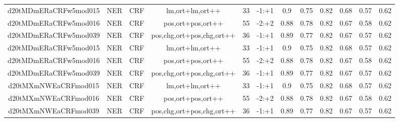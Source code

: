 \documentclass[a4paper]{article}
\begin{document}
\begin{landscape}
\begin{center}
\begin{tabular}{ |c|c|c|c|c|c|c|c|c|c|c|c|}
 	\small{ d20tMDmERaCRFw5mod015 } & \small{ NER} & \small{  CRF }  & lm,ort+lm,ort++  &  33 &  \small{  -1:+1 }  &  0.9 & 0.75 & 0.82  &  0.68 & 0.57 & 0.62 \\
 	

 
 	
 	\small{ d20tMDmERaCRFw5mod016 } & \small{ NER} & \small{  CRF }  & pos,ort+pos,ort++  &  55 &  \small{  -2:+2 }  &  0.88 & 0.78 & 0.82  &  0.67 & 0.58 & 0.62 \\
 	

 
 	
 	\small{ d20tMDmERaCRFw5mod039 } & \small{ NER} & \small{  CRF }  & pos,chg,ort+pos,chg,ort++  &  36 &  \small{  -1:+1 }  &  0.89 & 0.77 & 0.82  &  0.67 & 0.57 & 0.62 \\
 	

 
 	
 	\small{ d20tMDmERaCRFw5mod015 } & \small{ NER} & \small{  CRF }  & lm,ort+lm,ort++  &  33 &  \small{  -1:+1 }  &  0.9 & 0.75 & 0.82  &  0.68 & 0.57 & 0.62 \\
 	

 
 	
 	\small{ d20tMDmERaCRFw5mod016 } & \small{ NER} & \small{  CRF }  & pos,ort+pos,ort++  &  55 &  \small{  -2:+2 }  &  0.88 & 0.78 & 0.82  &  0.67 & 0.58 & 0.62 \\
 	

 
 	
 	\small{ d20tMDmERaCRFw5mod039 } & \small{ NER} & \small{  CRF }  & pos,chg,ort+pos,chg,ort++  &  36 &  \small{  -1:+1 }  &  0.89 & 0.77 & 0.82  &  0.67 & 0.57 & 0.62 \\
 	

 
 	
 	\small{ d20tMXmNWEaCRFmod015 } & \small{ NER} & \small{  CRF }  & lm,ort+lm,ort++  &  33 &  \small{  -1:+1 }  &  0.9 & 0.75 & 0.82  &  0.68 & 0.57 & 0.62 \\
 	

 
 	
 	\small{ d20tMXmNWEaCRFmod016 } & \small{ NER} & \small{  CRF }  & pos,ort+pos,ort++  &  55 &  \small{  -2:+2 }  &  0.88 & 0.78 & 0.82  &  0.67 & 0.58 & 0.62 \\
 	

 
 	
 	\small{ d20tMXmNWEaCRFmod039 } & \small{ NER} & \small{  CRF }  & pos,chg,ort+pos,chg,ort++  &  36 &  \small{  -1:+1 }  &  0.89 & 0.77 & 0.82  &  0.67 & 0.57 & 0.62 \\
 	


\end{tabular}
\end{center}
\end{landscape}
\end{document}
